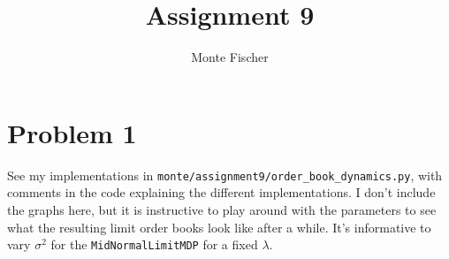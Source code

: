 \documentclass{article}
\title{Assignment 9}
\author{Monte Fischer}
\begin{document}
\maketitle

\section*{Problem 1}
See my implementations in \texttt{monte/assignment9/order\_book\_dynamics.py}, with comments in the code explaining the different implementations. I don't include the graphs here, but it is instructive to play around with the parameters to see what the resulting limit order books look like after a while. It's informative to vary $\sigma^2$ for the \texttt{MidNormalLimitMDP} for a fixed $\lambda$.
\end{document}
